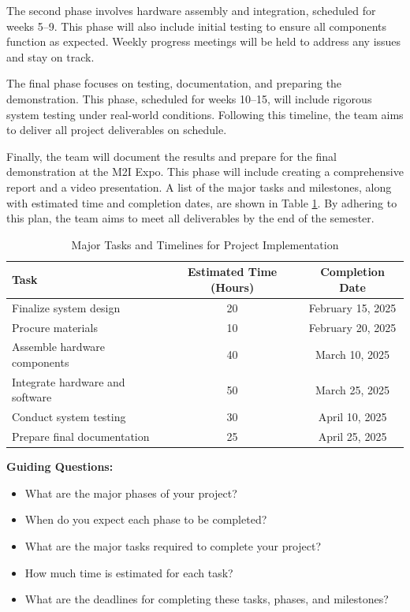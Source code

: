 The second phase involves hardware assembly and integration, scheduled for weeks 5–9. This phase will also include initial testing to ensure all components function as expected. Weekly progress meetings will be held to address any issues and stay on track.

The final phase focuses on testing, documentation, and preparing the demonstration. This phase, scheduled for weeks 10–15, will include rigorous system testing under real-world conditions. Following this timeline, the team aims to deliver all project deliverables on schedule. 

Finally, the team will document the results and prepare for the final demonstration at the M2I Expo. This phase will include creating a comprehensive report and a video presentation. A list of the major tasks and milestones, along with estimated time and completion dates, are shown in Table \ref{tab:majortasks}. By adhering to this plan, the team aims to meet all deliverables by the end of the semester.

\begin{table}[ht!]
    \centering
    \begin{tabular}{|l|c|c|}
        \hline
        \textbf{Task} & \textbf{Estimated Time (Hours)} & \textbf{Completion Date} \\ \hline
        Finalize system design & 20 & February 15, 2025 \\ \hline
        Procure materials & 10 & February 20, 2025 \\ \hline
        Assemble hardware components & 40 & March 10, 2025 \\ \hline
        Integrate hardware and software & 50 & March 25, 2025 \\ \hline
        Conduct system testing & 30 & April 10, 2025 \\ \hline
        Prepare final documentation & 25 & April 25, 2025 \\ \hline
    \end{tabular}
    \caption{Major Tasks and Timelines for Project Implementation}
    \label{tab:majortasks}
\end{table}

\textbf{Guiding Questions:}
\begin{itemize}
    \item What are the major phases of your project?
    \item When do you expect each phase to be completed?
    \item What are the major tasks required to complete your project?
    \item How much time is estimated for each task?
    \item What are the deadlines for completing these tasks, phases, and milestones?
\end{itemize}

